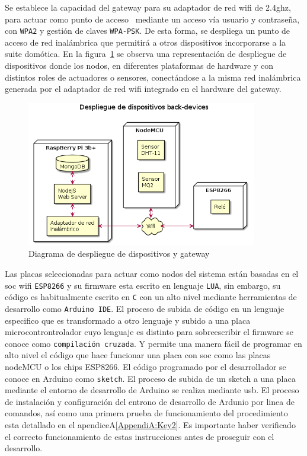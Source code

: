 \vspace{1cm}

Se establece la capacidad del \gls{gateway} para su adaptador de red \gls{wifi} de 2.4ghz, para actuar como punto de acceso~\cite{raspberrypiasaccesspoint} mediante un acceso vía usuario y contraseña, con \verb|WPA2| y gestión de claves \verb|WPA-PSK|. De esta forma, se despliega un punto de acceso de red inalámbrica que permitirá a otros dispositivos incorporarse a la suite domótica. En la figura~\ref{deploydevicesGateway} se observa una representación de despliegue de dispositivos donde los nodos, en diferentes plataformas de hardware y con distintos roles de actuadores o sensores, conectándose a la misma red inalámbrica generada por el adaptador de red \gls{wifi} integrado en el hardware del \gls{gateway}.

\begin{figure}[hbt!]
\label{deploydevicesGateway}
\centering
\includegraphics[height=2.5in]{figures/diagrams/physical-devices/back-devices.png}
\caption[Diagrama de despliegue de back-end]{Diagrama de despliegue de dispositivos y gateway\footnotemark}
\end{figure}

\vspace{1cm}

Las placas seleccionadas para actuar como nodos del sistema están basadas en el \gls{soc} \gls{wifi} \verb|ESP8266| y su firmware esta escrito en lenguaje \verb|LUA|, sin embargo, su código es habitualmente escrito en \verb|C| con un alto nivel mediante herramientas de desarrollo como \verb|Arduino IDE|. El proceso de subida de código en un lenguaje especifico que es transformado a otro lenguaje y subido a una placa microcontrontrolador cuyo lenguaje es distinto para sobreescribir el firmware se conoce como \verb|compilación cruzada|. Y permite una manera fácil de programar en alto nivel el código que hace funcionar una placa con \gls{soc} como las placas nodeMCU o los chips ESP8266. El código programado por el desarrollador se conoce en Arduino como \verb|sketch|. El proceso de subida de un \gls{sketch} a una placa mediante el entorno de desarrollo de Arduino se realiza mediante \gls{usb}. El proceso de instalación y configuración del entrono de desarrollo de Ardunio por linea de comandos, así como una primera prueba de funcionamiento del procedimiento esta detallado en el apendiceA\ref{AppendiA:Key2}. Es importante haber verificado el correcto funcionamiento de estas instrucciones antes de proseguir con el desarrollo.

